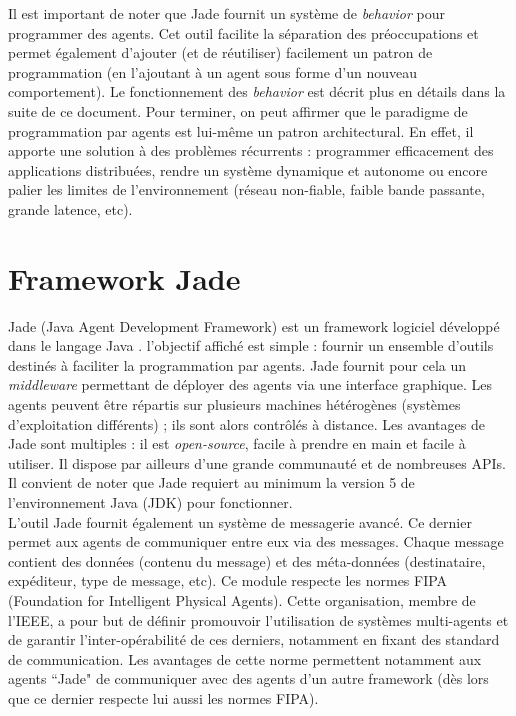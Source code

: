 \documentclass[conference]{IEEEtran}
\begin{document}
Il est important de noter que Jade fournit un système de \textit{behavior} pour programmer des agents. Cet outil facilite la séparation des préoccupations et permet également d'ajouter (et de réutiliser) facilement un patron de programmation (en l'ajoutant à un agent sous forme d'un nouveau comportement). Le fonctionnement des \textit{behavior} est décrit plus en détails dans la suite de ce document. Pour terminer, on peut affirmer que le paradigme de programmation par agents est lui-même un patron architectural. En effet, il apporte une solution à des problèmes récurrents : programmer efficacement des applications distribuées, rendre un système dynamique et autonome ou encore palier les limites de l'environnement (réseau non-fiable, faible bande passante, grande latence, etc).\\

\section{Framework Jade}

Jade (Java Agent Development Framework) est un framework logiciel développé dans le langage Java \cite{jade}. l'objectif affiché est simple : fournir un ensemble d'outils destinés à faciliter la programmation par agents. Jade fournit pour cela un \textit{middleware} permettant de déployer des agents via une interface graphique. Les agents peuvent être répartis sur plusieurs machines hétérogènes (systèmes d'exploitation différents) ; ils sont alors contrôlés à distance. Les avantages de Jade sont multiples : il est \textit{open-source}, facile à prendre en main et facile à utiliser. Il dispose par ailleurs d'une grande communauté et de nombreuses APIs. Il convient de noter que Jade requiert au minimum la version 5 de l'environnement Java (JDK) pour fonctionner.\\

L'outil Jade fournit également un système de messagerie avancé. Ce dernier permet aux agents de communiquer entre eux via des messages. Chaque message contient des données (contenu du message) et des méta-données (destinataire, expéditeur, type de message, etc). Ce module respecte les normes FIPA (Foundation for Intelligent Physical Agents). Cette organisation, membre de l'IEEE, a pour but de définir promouvoir l'utilisation de systèmes multi-agents et de garantir l'inter-opérabilité de ces derniers, notamment en fixant des standard de communication. Les avantages de cette norme permettent notamment aux agents ``Jade" de communiquer avec des agents d'un autre framework (dès lors que ce dernier respecte lui aussi les normes FIPA).\\
\end{document}
